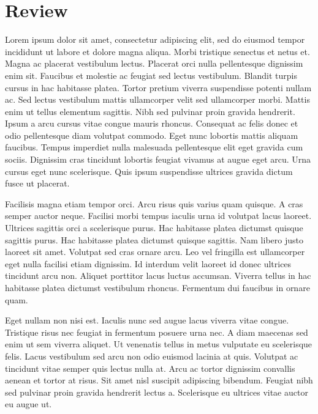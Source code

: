 \documentclass[12pt, oneside, a4paper]{article}
\begin{document}
\section*{Review}
Lorem ipsum dolor sit amet, consectetur adipiscing elit, sed do eiusmod tempor incididunt ut labore et dolore magna aliqua. Morbi tristique senectus et netus et. Magna ac placerat vestibulum lectus. Placerat orci nulla pellentesque dignissim enim sit. Faucibus et molestie ac feugiat sed lectus vestibulum. Blandit turpis cursus in hac habitasse platea. Tortor pretium viverra suspendisse potenti nullam ac. Sed lectus vestibulum mattis ullamcorper velit sed ullamcorper morbi. Mattis enim ut tellus elementum sagittis. Nibh sed pulvinar proin gravida hendrerit. Ipsum a arcu cursus vitae congue mauris rhoncus. Consequat ac felis donec et odio pellentesque diam volutpat commodo. Eget nunc lobortis mattis aliquam faucibus. Tempus imperdiet nulla malesuada pellentesque elit eget gravida cum sociis. Dignissim cras tincidunt lobortis feugiat vivamus at augue eget arcu. Urna cursus eget nunc scelerisque. Quis ipsum suspendisse ultrices gravida dictum fusce ut placerat.

Facilisis magna etiam tempor orci. Arcu risus quis varius quam quisque. A cras semper auctor neque. Facilisi morbi tempus iaculis urna id volutpat lacus laoreet. Ultrices sagittis orci a scelerisque purus. Hac habitasse platea dictumst quisque sagittis purus. Hac habitasse platea dictumst quisque sagittis. Nam libero justo laoreet sit amet. Volutpat sed cras ornare arcu. Leo vel fringilla est ullamcorper eget nulla facilisi etiam dignissim. Id interdum velit laoreet id donec ultrices tincidunt arcu non. Aliquet porttitor lacus luctus accumsan. Viverra tellus in hac habitasse platea dictumst vestibulum rhoncus. Fermentum dui faucibus in ornare quam.

Eget nullam non nisi est. Iaculis nunc sed augue lacus viverra vitae congue. Tristique risus nec feugiat in fermentum posuere urna nec. A diam maecenas sed enim ut sem viverra aliquet. Ut venenatis tellus in metus vulputate eu scelerisque felis. Lacus vestibulum sed arcu non odio euismod lacinia at quis. Volutpat ac tincidunt vitae semper quis lectus nulla at. Arcu ac tortor dignissim convallis aenean et tortor at risus. Sit amet nisl suscipit adipiscing bibendum. Feugiat nibh sed pulvinar proin gravida hendrerit lectus a. Scelerisque eu ultrices vitae auctor eu augue ut.
\end{document}

